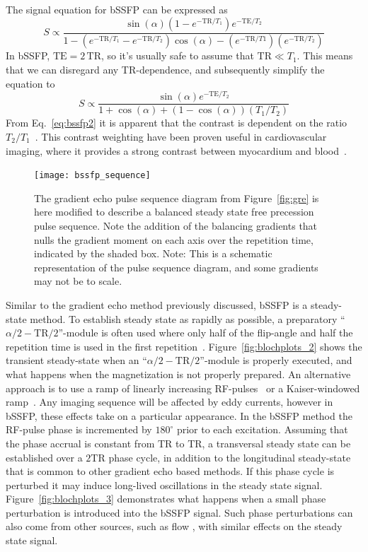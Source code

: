 The signal equation for bSSFP can be expressed as
\begin{equation}
    S \propto \frac{\sin(\alpha)(1-e^{-\textrm{TR}/T_1})e^{-\textrm{TE}/T_2}}{1-(e^{-\textrm{TR}/T_1}-e^{-\textrm{TR}/T_2})\cos(\alpha)-(e^{-\textrm{TR}/T1})(e^{-\textrm{TR}/T_2})}
    \label{eq:bssfp1}
\end{equation}
In bSSFP, $\textrm{TE} = 2\,\textrm{TR}$, so it's usually safe to assume that $\textrm{TR} \ll T_1$. This means that we can disregard any TR-dependence, and subsequently simplify the equation to
\begin{equation}
    S \propto \frac{\sin(\alpha)e^{-\textrm{TE}/T_2}}{1+\cos(\alpha)+(1-\cos(\alpha))(T_1/T_2)}
    \label{eq:bssfp2}
\end{equation}
From Eq.~\ref{eq:bssfp2} it is apparent that the contrast is dependent on the ratio $T_2/T_1$~\cite{Huang2002}. This contrast weighting have been proven useful in cardiovascular imaging, where it provides a strong contrast between myocardium and blood~\cite{Caudron2011, Bieri2013}. 
\begin{figure}
    \centering
    \texttt{[image: bssfp\_sequence]}
    \caption{The gradient echo pulse sequence diagram from Figure~\ref{fig:gre} is here modified to describe a balanced steady state free precession pulse sequence. Note the addition of the balancing gradients that nulls the gradient moment on each axis over the repetition time, indicated by the shaded box. Note: This is a schematic representation of the pulse sequence diagram, and some gradients may not be to scale.}
    \label{fig:bssfp}
\end{figure}
Similar to the gradient echo method previously discussed, bSSFP is a steady-state method. To establish steady state as rapidly as possible, a preparatory ``$\alpha/2-\textrm{TR}/2$''-module is often used where only half of the flip-angle and half the repetition time is used in the first repetition~\cite{Deiming1994:ISMRM}. Figure~\ref{fig:blochplots_2} shows the transient steady-state when an ``$\alpha/2-\textrm{TR}/2$''-module is properly executed, and what happens when the magnetization is not properly prepared. An alternative approach is to use a ramp of linearly increasing RF-pulses~\cite{Nishimura2000:ISMRM, Deshpande2003} or a Kaiser-windowed ramp~\cite{LeRoux2003}.
Any imaging sequence will be affected by eddy currents, however in bSSFP, these effects take on a particular appearance. In the bSSFP method the RF-pulse phase is incremented by $180^\circ$ prior to each excitation. Assuming that the phase accrual is constant from TR to TR, a transversal steady state can be established over a $2 \textrm{TR}$ phase cycle, in addition to the longitudinal steady-state that is common to other gradient echo based methods. If this phase cycle is perturbed it may induce long-lived oscillations in the steady state signal. Figure~\ref{fig:blochplots_3} demonstrates what happens when a small phase perturbation is introduced into the bSSFP signal. Such phase perturbations can also come from other sources, such as flow \cite{Lagerstrand2009}, with similar effects on the steady state signal.
